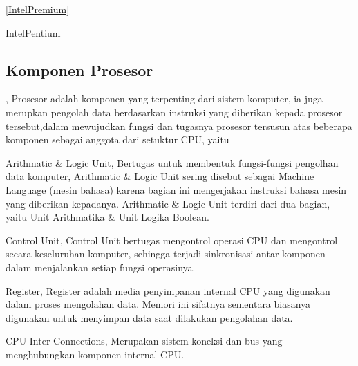 \ref{IntelPremium}
\begin{Figure}[ht]
\caption{IntelPentium}
\label{IntelPentium}
\end{Figure}

\subsection{Komponen Prosesor},
Prosesor adalah komponen yang terpenting dari sistem komputer, ia juga merupkan pengolah data berdasarkan instruksi yang diberikan kepada
prosesor tersebut,dalam mewujudkan fungsi dan tugasnya prosesor tersusun atas beberapa komponen sebagai anggota dari setuktur CPU, yaitu
	\item{Arithmatic & Logic Unit},
	Bertugas untuk membentuk fungsi-fungsi pengolhan data komputer, Arithmatic & Logic Unit sering disebut sebagai Machine Language
	(mesin bahasa) karena bagian ini mengerjakan instruksi bahasa mesin yang diberikan kepadanya. Arithmatic & Logic Unit terdiri
	dari dua bagian, yaitu Unit Arithmatika & Unit Logika Boolean.
	\item{Control Unit},
	Control Unit bertugas mengontrol operasi CPU dan mengontrol secara keseluruhan komputer, sehingga terjadi sinkronisasi antar komponen
	dalam menjalankan setiap fungsi operasinya.
	\item{Register},
	Register adalah media penyimpanan internal CPU yang digunakan dalam proses mengolahan data. Memori ini sifatnya sementara biasanya
	digunakan untuk menyimpan data saat dilakukan pengolahan data.
	\item{CPU Inter Connections},
	Merupakan sistem koneksi dan bus yang menghubungkan komponen internal CPU.
